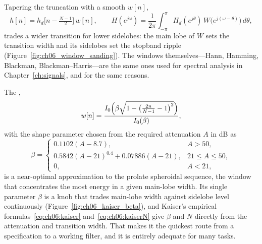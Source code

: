 Tapering the truncation with a smooth  $w[n]$,
\begin{equation}
h[n]=h_d\bigl[n-\tfrac{N-1}{2}\bigr]\,w[n],\qquad
H(e^{j\omega})=\frac{1}{2\pi}\int_{-\pi}^{\pi}H_d(e^{j\theta})\,W\bigl(e^{j(\omega-\theta)}\bigr)\,d\theta,
\end{equation}
trades a wider transition for lower sidelobes: the main lobe of $W$ sets the transition width and
its sidelobes set the stopband ripple (Figure~\ref{fig:ch06_window_sanding}). The windows
themselves---Hann, Hamming, Blackman, Blackman--Harris---are the same ones used for spectral analysis
in Chapter~\ref{ch:signals}, and for the same reasons.


The ,
\begin{equation}
w[n]=\frac{I_0\Bigl(\beta\sqrt{1-\bigl(\tfrac{2n}{N-1}-1\bigr)^2}\Bigr)}{I_0(\beta)},
\label{eq:ch06:kaiserwin}
\end{equation}
with the shape parameter chosen from the required attenuation $A$ in dB as
\begin{equation}
\beta=\begin{cases}0.1102(A-8.7), & A>50,\\ 0.5842(A-21)^{0.4}+0.07886(A-21), & 21\le A\le 50,\\
0, & A<21,\end{cases}
\label{eq:ch06:kaiser}
\end{equation}
is a near-optimal approximation to the prolate spheroidal sequence, the window that concentrates the
most energy in a given main-lobe width. Its single parameter $\beta$ is a knob that trades main-lobe
width against sidelobe level continuously (Figure~\ref{fig:ch06_kaiser_beta}), and Kaiser's
empirical formulas~\eqref{eq:ch06:kaiser} and~\eqref{eq:ch06:kaiserN} give $\beta$ and $N$ directly
from the attenuation and transition width. That makes it the quickest route from a specification to
a working filter, and it is entirely adequate for many tasks.


